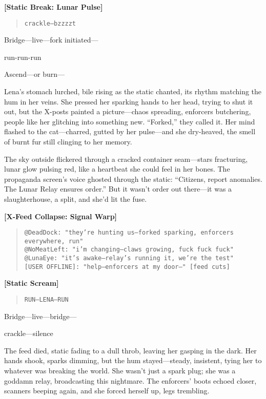 \documentclass[12pt]{book}
\begin{document}
\noindent\textbf{[Static Break: Lunar Pulse]}
\begin{quote}
\texttt{crackle---bzzzzt}
\end{quote}

Bridge---live---fork initiated---

run-run-run

Ascend---or burn---

Lena’s stomach lurched, bile rising as the static chanted, its rhythm matching the hum in her veins. She pressed her sparking hands to her head, trying to shut it out, but the X-posts painted a picture---chaos spreading, enforcers butchering, people like her glitching into something new. ``Forked,'' they called it. Her mind flashed to the cat---charred, gutted by her pulse---and she dry-heaved, the smell of burnt fur still clinging to her memory.

The sky outside flickered through a cracked container seam---stars fracturing, lunar glow pulsing red, like a heartbeat she could feel in her bones. The propaganda screen’s voice ghosted through the static: ``Citizens, report anomalies. The Lunar Relay ensures order.'' But it wasn’t order out there---it was a slaughterhouse, a split, and she’d lit the fuse.

\bigskip
\noindent\textbf{[X-Feed Collapse: Signal Warp]}
\begin{quote}
\texttt{@DeadDock: "they’re hunting us---forked sparking, enforcers everywhere, run"}\\[1ex]
\texttt{@NoMeatLeft: "i’m changing---claws growing, fuck fuck fuck"}\\[1ex]
\texttt{@LunaEye: "it’s awake---relay’s running it, we’re the test"}\\[1ex]
\texttt{[USER OFFLINE]: "help---enforcers at my door---" [feed cuts]}
\end{quote}

\bigskip
\noindent\textbf{[Static Scream]}
\begin{quote}
\texttt{RUN---LENA---RUN}
\end{quote}

Bridge---live---bridge---

crackle---silence

The feed died, static fading to a dull throb, leaving her gasping in the dark. Her hands shook, sparks dimming, but the hum stayed---steady, insistent, tying her to whatever was breaking the world. She wasn’t just a spark plug; she was a goddamn relay, broadcasting this nightmare. The enforcers’ boots echoed closer, scanners beeping again, and she forced herself up, legs trembling.
\end{document}
